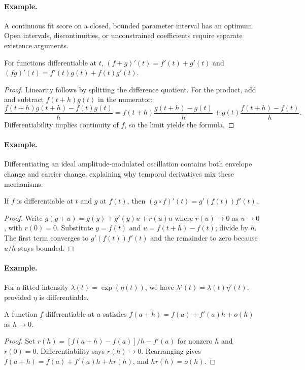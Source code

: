 \paragraph{Example.} A continuous fit score on a closed, bounded parameter interval has an optimum. Open intervals, discontinuities, or unconstrained coefficients require separate existence arguments.

\begin{proposition}For functions differentiable at $t$, $(f+g)'(t)=f'(t)+g'(t)$ and $(fg)'(t)=f'(t)g(t)+f(t)g'(t)$.\end{proposition}
\begin{proof}Linearity follows by splitting the difference quotient. For the product, add and subtract $f(t+h)g(t)$ in the numerator:
\[
\frac{f(t+h)g(t+h)-f(t)g(t)}h=
 f(t+h)\frac{g(t+h)-g(t)}h+
 g(t)\frac{f(t+h)-f(t)}h.
\]
Differentiability implies continuity of $f$, so the limit yields the formula.\end{proof}
\paragraph{Example.} Differentiating an ideal amplitude-modulated oscillation contains both envelope change and carrier change, explaining why temporal derivatives mix these mechanisms.

\begin{theorem}If $f$ is differentiable at $t$ and $g$ at $f(t)$, then $(g\circ f)'(t)=g'(f(t))f'(t)$.\end{theorem}
\begin{proof}Write $g(y+u)=g(y)+g'(y)u+r(u)u$ where $r(u)\to0$ as $u\to0$, with $r(0)=0$. Substitute $y=f(t)$ and $u=f(t+h)-f(t)$; divide by $h$. The first term converges to $g'(f(t))f'(t)$ and the remainder to zero because $u/h$ stays bounded.\end{proof}
\paragraph{Example.} For a fitted intensity $\lambda(t)=\exp(\eta(t))$, we have $\lambda'(t)=\lambda(t)\eta'(t)$, provided $\eta$ is differentiable.

\begin{proposition}A function $f$ differentiable at $a$ satisfies $f(a+h)=f(a)+f'(a)h+o(h)$ as $h\to0$.\end{proposition}
\begin{proof}Set $r(h)=[f(a+h)-f(a)]/h-f'(a)$ for nonzero $h$ and $r(0)=0$. Differentiability says $r(h)\to0$. Rearranging gives $f(a+h)=f(a)+f'(a)h+h r(h)$, and $h r(h)=o(h)$.\end{proof}
